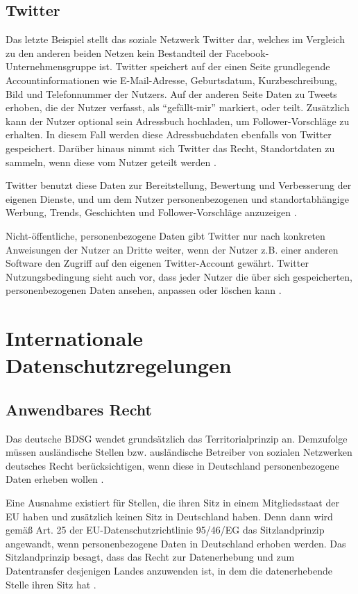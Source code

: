 \section{Twitter}
Das letzte Beispiel stellt das soziale Netzwerk Twitter dar, welches im Vergleich zu den anderen beiden Netzen kein Bestandteil der Facebook-Unternehmensgruppe ist. Twitter speichert auf der einen Seite grundlegende Accountinformationen wie E-Mail-Adresse, Geburtsdatum, Kurzbeschreibung, Bild und Telefonnummer der Nutzers.  Auf der anderen Seite Daten zu Tweets erhoben, die der Nutzer verfasst, als "`gefällt-mir"' markiert, oder teilt. Zusätzlich kann der Nutzer optional sein Adressbuch hochladen, um Follower-Vorschläge zu erhalten. In diesem Fall werden diese Adressbuchdaten ebenfalls von Twitter gespeichert. Darüber hinaus nimmt sich Twitter das Recht, Standortdaten zu sammeln, wenn diese vom Nutzer geteilt werden \autocite[vgl.][]{TwitterInc..2017}.
\par
Twitter benutzt diese Daten zur Bereitstellung, Bewertung und Verbesserung der eigenen Dienste, und um dem Nutzer personenbezogenen und standortabhängige Werbung, Trends, Geschichten und Follower-Vorschläge anzuzeigen \autocite[vgl.][]{TwitterInc..2017}. 
\par
Nicht-öffentliche, personenbezogene Daten gibt Twitter nur nach konkreten Anweisungen der Nutzer an Dritte weiter, wenn der Nutzer z.B. einer anderen Software den Zugriff auf den eigenen Twitter-Account gewährt. Twitter Nutzungsbedingung sieht auch vor, dass jeder Nutzer die über sich gespeicherten, personenbezogenen Daten ansehen, anpassen oder löschen kann \autocite[vgl.][]{TwitterInc..2017}.

\chapter{Internationale Datenschutzregelungen}
\section{Anwendbares Recht}
Das deutsche \ac{BDSG} wendet grundsätzlich das Territorialprinzip an. Demzufolge müssen ausländische Stellen bzw. ausländische Betreiber von sozialen Netzwerken deutsches Recht berücksichtigen, wenn diese in Deutschland personenbezogene Daten erheben wollen \autocite[vgl.][]{ICS.2011}.
\par
Eine Ausnahme existiert für Stellen, die ihren Sitz in einem Mitgliedsstaat der \ac{EU} haben und zusätzlich keinen Sitz in Deutschland haben. Denn dann wird gemäß Art. 25 der EU-Datenschutzrichtlinie 95/46/EG das Sitzlandprinzip angewandt, wenn personenbezogene Daten in Deutschland erhoben werden. Das Sitzlandprinzip besagt, dass das Recht zur Datenerhebung und zum Datentransfer desjenigen Landes anzuwenden ist, in dem die datenerhebende Stelle ihren Sitz hat \autocite[vgl.][]{ICS.2011} \autocite[vgl.][]{EG.1995}.

